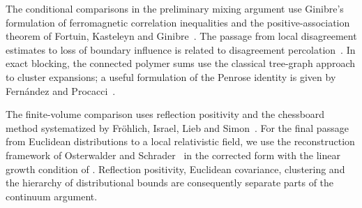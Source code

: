 The conditional comparisons in the preliminary mixing argument use
Ginibre's formulation of ferromagnetic correlation inequalities and
the positive-association theorem of Fortuin, Kasteleyn and Ginibre~\cite{Ginibre1970,FortuinKasteleynGinibre1971}.
The passage from local disagreement estimates to loss of boundary
influence is related to disagreement percolation~\cite{VanDenBergMaes1994}.
In exact blocking, the connected polymer sums use the classical
tree-graph approach to cluster expansions; a useful formulation of
the Penrose identity is given by Fern\'andez and
Procacci~\cite{FernandezProcacci}.

The finite-volume comparison uses reflection positivity and the
chessboard method systematized by Fr\"ohlich, Israel, Lieb and
Simon~\cite{FILS78,FILS80}.  For the final passage from Euclidean
distributions to a local relativistic field, we use the reconstruction
framework of Osterwalder and Schrader~\cite{OS73} in the corrected
form with the linear growth condition of \cite[Section~IV.1]{OS75}.
Reflection positivity, Euclidean covariance, clustering and the
hierarchy of distributional bounds are consequently separate parts
of the continuum argument.
